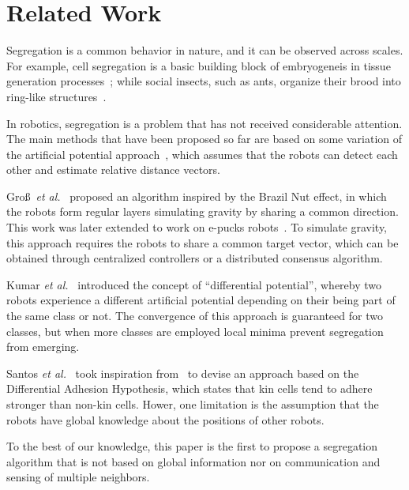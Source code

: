 \documentclass[conference]{IEEEtran}
\begin{document}
\section{Related Work}
Segregation is a common behavior in nature, and it can be observed across
scales. For example, cell segregation is a basic building block of embryogeneis
in tissue generation processes~\cite{batlle_molecular_2012,Steinberg1963}; while
social insects, such as ants, organize their brood into ring-like
structures~\cite{Franks1992}.

In robotics, segregation is a problem that has not received considerable
attention. The main methods that have been proposed so far are based on some
variation of the artificial potential approach~\cite{Spears2004}, which assumes
that the robots can detect each other and estimate relative distance vectors.

Gro\ss~\emph{et al.}~\cite{gross_segregation_2009} proposed an
algorithm inspired by the Brazil Nut effect, in which the robots form regular
layers simulating gravity by sharing a common direction. This work was later
extended to work on e-pucks robots~\cite{Chen2012}. To simulate gravity, this
approach requires the robots to share a common target vector, which can be
obtained through centralized controllers or a distributed consensus algorithm.

Kumar \emph{et al.}~\cite{kumar_segregation_2010} introduced the concept of
``differential potential'', whereby two robots experience a different artificial
potential depending on their being part of the same class or not. The
convergence of this approach is guaranteed for two classes, but when more
classes are employed local minima prevent segregation from emerging.

Santos \emph{et al.}~\cite{santos_segregation_2014} took inspiration
from~\cite{kumar_segregation_2010} to devise an approach based on the
Differential Adhesion Hypothesis, which states that kin cells tend to adhere
stronger than non-kin cells. Hower, one limitation is the assumption
that the robots have global knowledge about the positions of other robots.

To the best of our knowledge, this paper is the first to propose a segregation
algorithm that is not based on global information nor on communication and
sensing of multiple neighbors.




\end{document}
